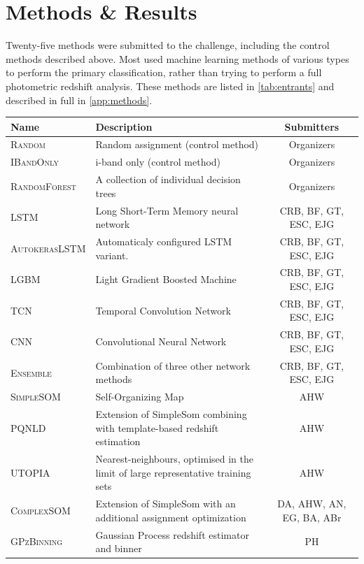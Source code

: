\documentclass[twocolumn,twocolappendix]{aastex63}
\begin{document}
\section{Methods \& Results} \label{sec:results}


Twenty-five methods were submitted to the challenge, including the control methods described above.
Most used machine learning methods of various types to perform the primary classification,
rather than trying to perform a full photometric redshift analysis.  
These methods are listed in \autoref{tab:entrants} and described in full in \autoref{app:methods}.

\begin{table}[]
	\begin{tabular}{|l|p{8cm}|c|}
	\hline
	\textbf{Name} & \textbf{Description} & \textbf{Submitters} \\
	\hline
	\textsc{Random} & Random assignment (control method)  & Organizers \\
	\textsc{IBandOnly} & i-band only (control method)  & Organizers \\
	\textsc{RandomForest} & A collection of individual decision trees & Organizers \\
	\textsc{LSTM} & Long Short-Term Memory neural network & CRB, BF, GT, ESC, EJG \\
	\textsc{AutokerasLSTM}\tablenotemark{a} & Automaticaly configured LSTM variant. & CRB, BF, GT, ESC, EJG \\
	\textsc{LGBM} & Light Gradient Boosted Machine & CRB, BF, GT, ESC, EJG \\
	\textsc{TCN} & Temporal Convolution Network & CRB, BF, GT, ESC, EJG \\
	\textsc{CNN} & Convolutional Neural Network & CRB, BF, GT, ESC, EJG \\
	\textsc{Ensemble} & Combination of three other network methods & CRB, BF, GT, ESC, EJG \\
	\textsc{SimpleSOM} & Self-Organizing Map & AHW \\
	\textsc{PQNLD} & Extension of {\sc SimpleSom} combining with template-based redshift estimation & AHW \\
	\textsc{UTOPIA} & Nearest-neighbours, optimised in the limit of large representative training sets & AHW \\
	\textsc{ComplexSOM} & Extension of {\sc SimpleSom} with an additional assignment optimization & DA, AHW, AN, EG, BA, ABr \\
	\textsc{GPzBinning} & Gaussian Process redshift estimator and binner & PH \\

\end{tabular}
\end{table}
\end{document}

